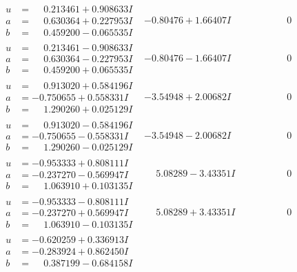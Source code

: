 \documentclass[1p]{elsarticle_modified}
\theoremstyle{definition}
\begin{document}
$$\begin{array}{c|c|c}
\begin{aligned}
u &= \phantom{-}0.213461 + 0.908633 I \\
a &= \phantom{-}0.630364 + 0.227953 I \\
b &= \phantom{-}0.459200 - 0.065535 I\end{aligned}
 & -0.80476 + 1.66407 I & \phantom{-0.000000 } 0 \\ \hline\begin{aligned}
u &= \phantom{-}0.213461 - 0.908633 I \\
a &= \phantom{-}0.630364 - 0.227953 I \\
b &= \phantom{-}0.459200 + 0.065535 I\end{aligned}
 & -0.80476 - 1.66407 I & \phantom{-0.000000 } 0 \\ \hline\begin{aligned}
u &= \phantom{-}0.913020 + 0.584196 I \\
a &= -0.750655 + 0.558331 I \\
b &= \phantom{-}1.290260 + 0.025129 I\end{aligned}
 & -3.54948 + 2.00682 I & \phantom{-0.000000 } 0 \\ \hline\begin{aligned}
u &= \phantom{-}0.913020 - 0.584196 I \\
a &= -0.750655 - 0.558331 I \\
b &= \phantom{-}1.290260 - 0.025129 I\end{aligned}
 & -3.54948 - 2.00682 I & \phantom{-0.000000 } 0 \\ \hline\begin{aligned}
u &= -0.953333 + 0.808111 I \\
a &= -0.237270 - 0.569947 I \\
b &= \phantom{-}1.063910 + 0.103135 I\end{aligned}
 & \phantom{-}5.08289 - 3.43351 I & \phantom{-0.000000 } 0 \\ \hline\begin{aligned}
u &= -0.953333 - 0.808111 I \\
a &= -0.237270 + 0.569947 I \\
b &= \phantom{-}1.063910 - 0.103135 I\end{aligned}
 & \phantom{-}5.08289 + 3.43351 I & \phantom{-0.000000 } 0 \\ \hline\begin{aligned}
u &= -0.620259 + 0.336913 I \\
a &= -0.283924 + 0.862450 I \\
b &= \phantom{-}0.387199 - 0.684158 I\end{aligned}

\end{array}$$
\end{document}
